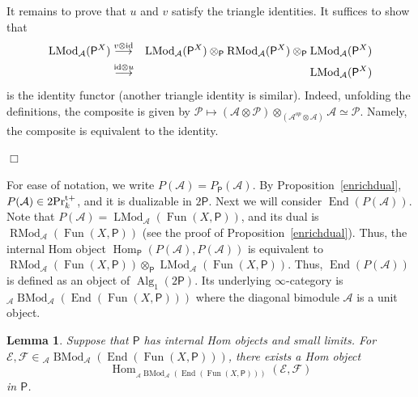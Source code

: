 \documentclass[leqno,12pt]{amsart}
\theoremstyle{plain}
\newtheorem{Lemma}[Theorem]{Lemma}
\theoremstyle{definition}
\newcommand{\PRTT}{\textup{Pr}^{\textup{t}+}}
\newcommand{\Hom}{\operatorname{Hom}}
\newcommand{\Fun}{\operatorname{Fun}}
\newcommand{\Alg}{\operatorname{Alg}}
\newcommand{\End}{\operatorname{End}}
\newcommand{\LMod}{\operatorname{LMod}}
\newcommand{\RMod}{\operatorname{RMod}}
\newcommand{\BMod}{\operatorname{BMod}}
\newcommand{\QED}{{\unskip\nobreak\hfil\penalty50\quad\null\nobreak\hfil
{$\Box$}\parfillskip0pt\finalhyphendemerits0\par\medskip}}
\begin{document}
It remains to prove that $u$ and $v$ satisfy the triangle identities.
It suffices to show that 
\begin{eqnarray*}
\LMod_{\mathcal{A}}(\mathsf{P}^X) &\stackrel{v\otimes \textup{id}}\longrightarrow & \LMod_{\mathcal{A}}(\mathsf{P}^X)\otimes_{\mathsf{P}} \RMod_{\mathcal{A}}(\mathsf{P}^X)\otimes_{\mathsf{P}}\LMod_{\mathcal{A}}(\mathsf{P}^X) \\
&\stackrel{\textup{id}\otimes u}{\longrightarrow}& \LMod_{\mathcal{A}}(\mathsf{P}^X)
\end{eqnarray*}
is the identity functor (another triangle identity is similar).
Indeed, unfolding the definitions, the composite is 
given by $\mathcal{P}\mapsto (\mathcal{A}\otimes \mathcal{P})\otimes_{(\mathcal{A}^{op}\otimes\mathcal{A})}\mathcal{A}\simeq \mathcal{P}$.
Namely, the composite is equivalent to the identity.
\QED

For ease of notation, we write $P(\mathcal{A})=P_{\mathsf{P}}(\mathcal{A})$.  
By Proposition~\ref{enrichdual}, $P(\mathcal{A})\in 2\PRTT_k$, and it is dualizable in $2\mathsf{P}$.
Next we will consider $\End(P(\mathcal{A}))$.
Note that
$P(\mathcal{A})=\LMod_{\mathcal{A}}(\Fun(X,\mathsf{P}))$, and its dual is $\RMod_{\mathcal{A}}(\Fun(X,\mathsf{P}))$ (see the proof of Proposition~\ref{enrichdual}). 
Thus, the internal Hom object
$\Hom_{\mathsf{P}}(P(\mathcal{A}),P(\mathcal{A}))$ is equivalent to $\RMod_{\mathcal{A}}(\Fun(X,\mathsf{P}))\otimes_{\mathsf{P}}\LMod_{\mathcal{A}}(\Fun(X,\mathsf{P}))$.
Thus, $\End(P(\mathcal{A}))$ is defined as an object of $\Alg_1(2\mathsf{P})$. 
Its underlying $\infty$-category is ${}_{\mathcal{A}}\BMod_{\mathcal{A}}(\End(\Fun(X,\mathsf{P})))$ where the diagonal bimodule $\mathcal{A}$ is a unit object.



\begin{Lemma}
\label{bimodulehom}
Suppose that $\mathsf{P}$ has internal Hom objects and small limits.
For $\mathcal{E},\mathcal{F}\in {}_{\mathcal{A}}\BMod_{\mathcal{A}}(\End(\Fun(X,\mathsf{P})))$, there exists a Hom object
\[
\Hom_{{}_{\mathcal{A}}\BMod_{\mathcal{A}}(\End(\Fun(X,\mathsf{P})))}(\mathcal{E},\mathcal{F})
\]
in $\mathsf{P}$.
\end{Lemma}
\end{document}
